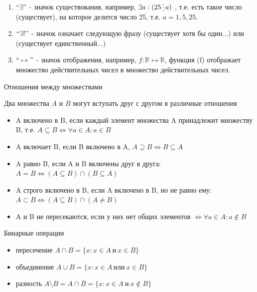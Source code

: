 \documentclass[a4paper,12pt]{article} %
\newcommand{\divisible}{\mathop{\raisebox{-2pt}{\vdots}}}
\begin{document}
\begin{enumerate}
\item $``\exists "$ - значок существования, например, $\exists a: (25 \divisible a)$
, т.е. есть такое число (существует), на которое делится число 25, т.е. $a = {1,5,25}$.
\item $``\exists !"$ - значок означает следующую фразу (существует хотя бы один...) или (существует единственный...)
\item $``\mapsto "$ - значок отображения, например, $f : \mathbb R \mapsto \mathbb R$, функция (f) отображает множество действительных чисел в множество действительных чисел.
\end{enumerate}

\begin{center}
 Отношения между множествами
\end{center}
Два множества $A$ и $B$ могут вступать друг с другом в различные отношения
\begin{itemize}
\item A включено в B, если каждый элемент множества A принадлежит множеству B,  т.е. $A \subseteq B \Leftrightarrow \forall a \in A : a \in B$
\item A включает B, если B включено в A, $A \supseteq B \Leftrightarrow B \subseteq A$
\item A равно B, если A и B включены друг в друга: $A = B \Leftrightarrow (A \subseteq B) \cap (B \subseteq A)$
\item A строго включено в B, если A включено в B, но не равно ему: $A \subset B \Leftrightarrow (A \subseteq B) \cap (A \not= B)$
\item A и B не пересекаются, если у них нет общих элементов $\Leftrightarrow \forall a \in A : a \notin B$
\end{itemize}
\begin{center}
Бинарные операции
\end{center}
\begin{itemize}
\item пересечение $A \cap B = \{x: x\in A\ и\ x\in B\}$
\item объединение $A \cup B = \{x: x\in A\ или\ x\in B\}$
\item разность $A \setminus B = A \cap \overline B = \{x: x\in A\ и\ x\notin B\}$
\end{itemize}
\end{document}
